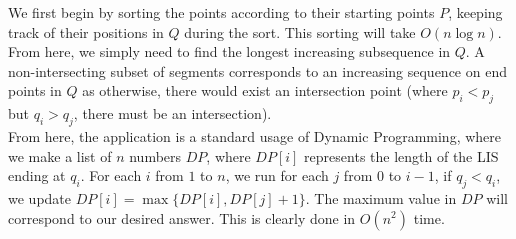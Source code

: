 \documentclass{article}
\begin{document}
\begin{solution}
We first begin by sorting the points according to their starting points $P$, keeping track of their positions in $Q$ during the sort. This sorting will take $O(n \log n)$. From here, we simply need to find the longest increasing subsequence in $Q$. A non-intersecting subset of segments corresponds to an increasing sequence on end points in $Q$ as otherwise, there would exist an intersection point (where $p_i < p_j$ but $q_i > q_j$, there must be an intersection).\\

From here, the application is a standard usage of Dynamic Programming, where we make a list of $n$ numbers $DP$, where $DP[i]$ represents the length of the LIS ending at $q_i$. For each $i$ from $1$ to $n$, we run for each $j$ from $0$ to $i-1$, if $q_j < q_i$, we update $DP[i] = \max \{DP[i], DP[j] + 1\}$. The maximum value in $DP$ will correspond to our desired answer. This is clearly done in $O(n^2)$ time.
\end{solution}
\end{document}
